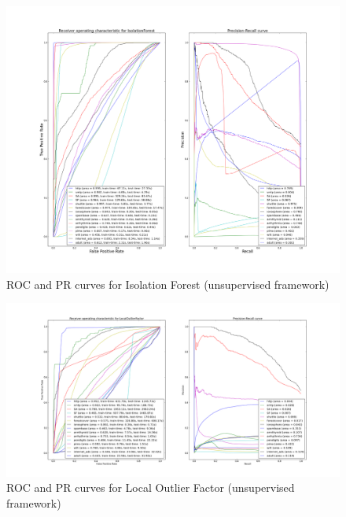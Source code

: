 \begin{figure}[!ht]
  \centering
  \includegraphics[width=1.1 \linewidth]{fig_source/bench_iforest_roc_pr_unsupervised.png}
  \caption{ROC and PR curves for Isolation Forest (unsupervised framework)}
  \label{back:fig:iforest_roc_pr_unsupervised}
\end{figure}


\begin{figure}[!ht]
  \centering
  \includegraphics[width=\linewidth]{fig_source/bench_lof_roc_pr_unsupervised.png}
  \caption{ROC and PR curves for Local Outlier Factor (unsupervised framework)}
  \label{back:fig:lof_roc_pr_unsupervised}
\end{figure}


